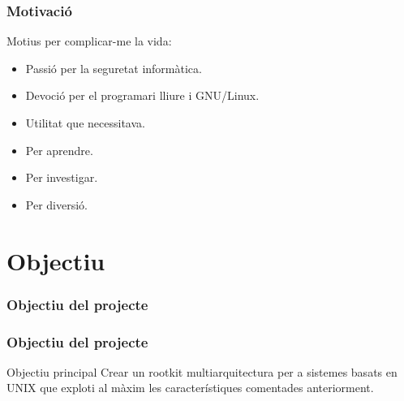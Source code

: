 \documentclass{beamer}
\begin{document}
\begin{frame}
	\frametitle{Motivació}
	\begin{block}{Motius per complicar-me la vida:}
		\begin{itemize}
			\item<1-> Passió per la seguretat informàtica.
			\item<2-> Devoció per el programari lliure i GNU/Linux.
			\item<3-> Utilitat que necessitava.
			\item<4-> Per aprendre.
			\item<5-> Per investigar.
			\item<6-> Per diversió.
		\end{itemize}
	\end{block}
\end{frame}

\section{Objectiu}
\begin{frame}
	\frametitle{Objectiu del projecte}
\end{frame}

\begin{frame}
	\frametitle{Objectiu del projecte}
	\begin{block}{Objectiu principal}
	Crear un rootkit multiarquitectura per a sistemes basats en UNIX que exploti al màxim 
	les característiques comentades anteriorment.
	\end{block}
\end{frame}
\end{document}
